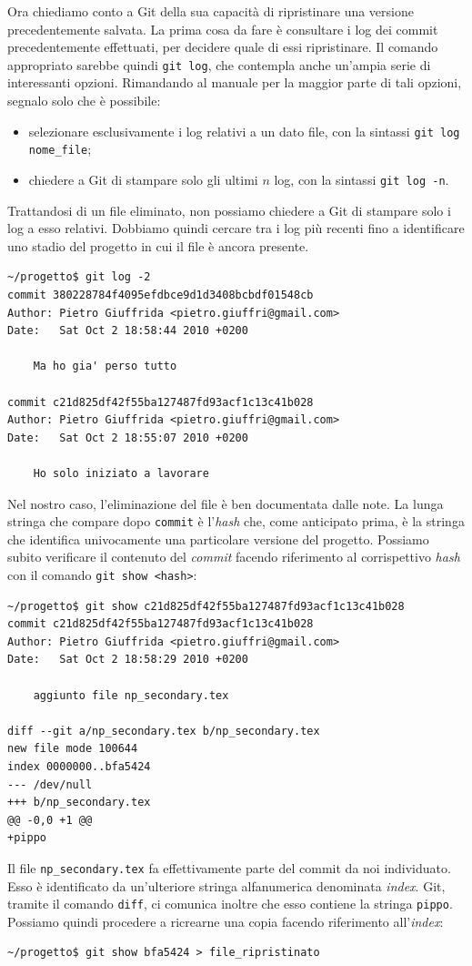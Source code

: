 \documentclass[a4paper,12pt,oneside]{article}
\begin{document}
Ora chiediamo conto a Git della sua capacità di ripristinare una versione
precedentemente salvata. La prima cosa da fare è consultare i log dei commit
precedentemente effettuati, per decidere quale di essi ripristinare. Il comando
appropriato sarebbe quindi \lstinline|git log|, che contempla anche un'ampia
serie di interessanti opzioni. Rimandando al manuale per la maggior parte di tali
opzioni, segnalo solo che è possibile:
\begin{itemize}
\item selezionare esclusivamente i log relativi a un dato file, con la
  sintassi \lstinline|git log nome_file|;
\item chiedere a Git di stampare solo gli ultimi $n$ log, con la
  sintassi \lstinline|git log -n|.
\end{itemize}
Trattandosi di un file eliminato, non possiamo chiedere a Git di stampare solo i
log a esso relativi. Dobbiamo quindi cercare tra i log più recenti fino a
identificare uno stadio del progetto in cui il file è ancora presente.
\begin{lstlisting}
~/progetto$ git log -2
commit 380228784f4095efdbce9d1d3408bcbdf01548cb
Author: Pietro Giuffrida <pietro.giuffri@gmail.com>
Date:   Sat Oct 2 18:58:44 2010 +0200

    Ma ho gia' perso tutto

commit c21d825df42f55ba127487fd93acf1c13c41b028
Author: Pietro Giuffrida <pietro.giuffri@gmail.com>
Date:   Sat Oct 2 18:55:07 2010 +0200

    Ho solo iniziato a lavorare
\end{lstlisting}
Nel nostro caso, l'eliminazione del file è ben documentata dalle note.
La lunga stringa che compare dopo \lstinline|commit| è l'\emph{hash} che, come
anticipato prima, è la stringa che identifica univocamente una particolare
versione del progetto. Possiamo subito verificare il contenuto del \emph{commit}
facendo riferimento al corrispettivo \emph{hash} con il comando
\lstinline[language={}]|git show <hash>|:
\begin{lstlisting}
~/progetto$ git show c21d825df42f55ba127487fd93acf1c13c41b028
commit c21d825df42f55ba127487fd93acf1c13c41b028
Author: Pietro Giuffrida <pietro.giuffri@gmail.com>
Date:   Sat Oct 2 18:58:29 2010 +0200

    aggiunto file np_secondary.tex

diff --git a/np_secondary.tex b/np_secondary.tex
new file mode 100644
index 0000000..bfa5424
--- /dev/null
+++ b/np_secondary.tex
@@ -0,0 +1 @@
+pippo
\end{lstlisting}
Il file \lstinline|np_secondary.tex| fa effettivamente parte del commit da noi
individuato. Esso è identificato da un'ulteriore stringa alfanumerica
denominata \emph{index}. Git, tramite il comando \lstinline|diff|, ci comunica
inoltre che esso contiene la stringa \lstinline|pippo|.
Possiamo quindi procedere a ricrearne una copia facendo riferimento
all'\emph{index}:
\begin{lstlisting}
~/progetto$ git show bfa5424 > file_ripristinato
\end{lstlisting}
\end{document}
